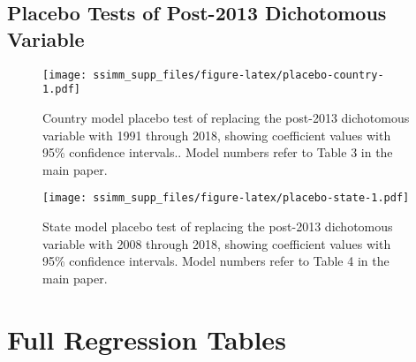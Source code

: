 \documentclass[
  11pt,
]{article}
\begin{document}
\newpage

\hypertarget{placebo-tests-of-post-2013-dichotomous-variable}{%
\subsection{Placebo Tests of Post-2013 Dichotomous Variable}\label{placebo-tests-of-post-2013-dichotomous-variable}}

\begin{figure}
\centering
\texttt{[image: ssimm\_supp\_files/figure-latex/placebo-country-1.pdf]}
\caption{\label{fig:placebo-country}Country model placebo test of replacing the post-2013 dichotomous variable with 1991 through 2018, showing coefficient values with 95\% confidence intervals.. Model numbers refer to Table 3 in the main paper.}
\end{figure}

\begin{figure}
\centering
\texttt{[image: ssimm\_supp\_files/figure-latex/placebo-state-1.pdf]}
\caption{\label{fig:placebo-state}State model placebo test of replacing the post-2013 dichotomous variable with 2008 through 2018, showing coefficient values with 95\% confidence intervals. Model numbers refer to Table 4 in the main paper.}
\end{figure}

\newpage

\hypertarget{full-regression-tables}{%
\section{Full Regression Tables}\label{full-regression-tables}}
\end{document}

